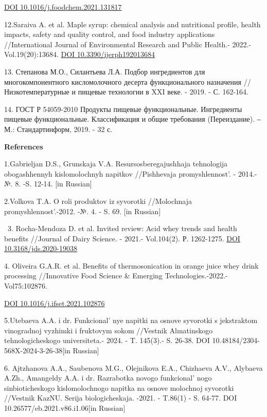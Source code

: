 {{\href{https://doi.org/10.1016/j.foodchem.2021.131817}{DOI
10.1016/j.foodchem.2021.131817}

12.Saraiva A. et al. Maple syrup: chemical analysis and nutritional
profile, health impacts, safety and quality control, and food industry
applications //International Journal of Environmental Research and
Public Health.- 2022.-Vol.19(20):13684.
\href{https://doi.org/10.3390/ijerph192013684}{DOI
10.3390/ijerph192013684}

13. Степанова М.О., Силантьева Л.А. Подбор ингредиентов для
многокомпонентного кисломолочного десерта функционального назначения
//Низкотемпературные и пищевые технологии в XXI веке. - 2019. - С.
162-164.

14. ГОСТ Р 54059-2010 Продукты пищевые функциональные. Ингредиенты
пищевые функциональные. Классификация и общие требования (Переиздание).
‒ М.: Стандартинформ, 2019. - 32 с.

{\bfseries References}

1.Gabrieljan D.S., Grunskaja V.A. Resursosberegajushhaja tehnologija
obogashhennyh kislomolochnyh napitkov //Pishhevaja
promyshlennost'. - 2014.- №. 8. -S. 12-14. {[}in
Russian{]}

2.Volkova T.A. O roli produktov iz syvorotki //Molochnaja
promyshlennost'.-2012. -№. 4. - S. 69. {[}in Russian{]}

~3. Rocha-Mendoza D. et al. Invited review: Acid whey trends and health
benefits //Journal of Dairy Science. - 2021.- Vol.104(2). Р. 1262-1275.
\href{https://doi.org/10.3168/jds.2020-19038}{DOI
10.3168/jds.2020-19038}

4. Oliveira G.A.R. et al. Benefits of thermosonication in orange juice
whey drink processing //Innovative Food Science \& Emerging
Technologies.-2022.- Vol75:102876.

\href{https://doi.org/10.1016/j.ifset.2021.102876}{DOI
10.1016/j.ifset.2021.102876}

5.Utebaeva A.A. i dr. Funkcional' nye napitki na osnove
syvorotki s jekstraktom vinogradnoj vyzhimki i fruktovym sokom //Vestnik
Almatinskogo tehnologicheskogo universiteta.- 2024. - T. 145(3).- S.
26-38. DOI 10.48184/2304-568X-2024-3-26-38{[}in Russian{]}

6. Ajtzhanova A.A., Saubenova M.G., Olejnikova E.A., Chizhaeva A.V.,
Alybaeva A.Zh., Amangeldy A.A. i dr. Razrabotka novogo
funkcional' nogo sinbioticheskogo kislomolochnogo napitka
na osnove molochnoj syvorotki //Vestnik KazNU. Serija biologicheskaja.
-2021. - T.86(1) - S. 64-77. DOI 10.26577/eb.2021.v86.i1.06{[}in
Russian{]}

}}
